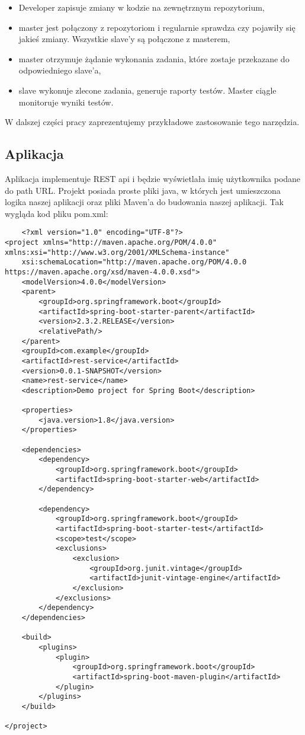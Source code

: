 \begin{itemize}
    \item Developer zapisuje zmiany w kodzie na zewnętrznym repozytorium,
    \item master jest połączony z repozytoriom i regularnie sprawdza czy pojawiły się jakieś zmiany. Wszystkie slave'y są połączone z masterem,
    \item master otrzymuje żądanie wykonania zadania, które zostaje przekazane do odpowiedniego slave'a,
    \item slave wykonuje zlecone zadania, generuje raporty testów. Master ciągle monitoruje wyniki testów.
\end{itemize}

W dalszej części pracy zaprezentujemy przykładowe zastosowanie tego narzędzia. 

\subsection{Aplikacja}

Aplikacja implementuje REST api i będzie wyświetlała imię użytkownika podane do path URL. Projekt posiada proste pliki java, w których jest umieszczona logika naszej aplikacji oraz pliki Maven'a do budowania naszej aplikacji. Tak wygląda kod pliku pom.xml:

\begin{lstlisting}
    <?xml version="1.0" encoding="UTF-8"?>
<project xmlns="http://maven.apache.org/POM/4.0.0" xmlns:xsi="http://www.w3.org/2001/XMLSchema-instance"
	xsi:schemaLocation="http://maven.apache.org/POM/4.0.0 https://maven.apache.org/xsd/maven-4.0.0.xsd">
	<modelVersion>4.0.0</modelVersion>
	<parent>
		<groupId>org.springframework.boot</groupId>
		<artifactId>spring-boot-starter-parent</artifactId>
		<version>2.3.2.RELEASE</version>
		<relativePath/>
	</parent>
	<groupId>com.example</groupId>
	<artifactId>rest-service</artifactId>
	<version>0.0.1-SNAPSHOT</version>
	<name>rest-service</name>
	<description>Demo project for Spring Boot</description>

	<properties>
		<java.version>1.8</java.version>
	</properties>

	<dependencies>
		<dependency>
			<groupId>org.springframework.boot</groupId>
			<artifactId>spring-boot-starter-web</artifactId>
		</dependency>

		<dependency>
			<groupId>org.springframework.boot</groupId>
			<artifactId>spring-boot-starter-test</artifactId>
			<scope>test</scope>
			<exclusions>
				<exclusion>
					<groupId>org.junit.vintage</groupId>
					<artifactId>junit-vintage-engine</artifactId>
				</exclusion>
			</exclusions>
		</dependency>
	</dependencies>

	<build>
		<plugins>
			<plugin>
				<groupId>org.springframework.boot</groupId>
				<artifactId>spring-boot-maven-plugin</artifactId>
			</plugin>
		</plugins>
	</build>

</project>

\end{lstlisting}

